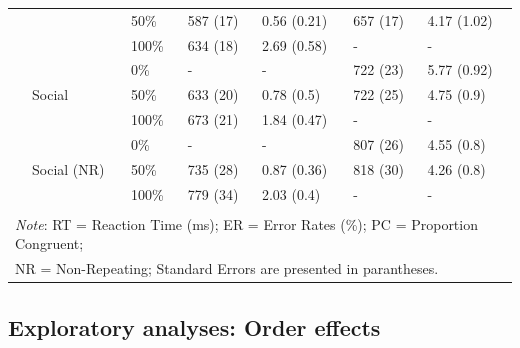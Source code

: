 \documentclass[english,,man,floatsintext]{apa6}
\begin{document}
\begin{table}[htbp]
\begin{tabular}{lllcccc}
& & \multicolumn{1}{l}{50\%} & \multicolumn{1}{l}{587 (17)} & \multicolumn{1}{l}{0.56 (0.21)} & \multicolumn{1}{l}{657 (17)} & \multicolumn{1}{l}{4.17 (1.02)} \\
& & \multicolumn{1}{l}{100\%} & \multicolumn{1}{l}{634 (18)} & \multicolumn{1}{l}{2.69 (0.58)} & \multicolumn{1}{l}{-} & \multicolumn{1}{l}{-} \\
\cmidrule(rl){2-7}
& \multirow{3}{*}{Social} & \multicolumn{1}{l}{0\%} & \multicolumn{1}{l}{-} & \multicolumn{1}{l}{-} & \multicolumn{1}{l}{722 (23)} & \multicolumn{1}{l}{5.77 (0.92)} \\
& & \multicolumn{1}{l}{50\%} & \multicolumn{1}{l}{633 (20)} & \multicolumn{1}{l}{0.78 (0.5)} & \multicolumn{1}{l}{722 (25)} & \multicolumn{1}{l}{4.75 (0.9)} \\
& & \multicolumn{1}{l}{100\%} & \multicolumn{1}{l}{673 (21)} & \multicolumn{1}{l}{1.84 (0.47)} & \multicolumn{1}{l}{-} & \multicolumn{1}{l}{-} \\
\cmidrule(rl){2-7}
& \multirow{3}{*}{Social (NR)} & \multicolumn{1}{l}{0\%} & \multicolumn{1}{l}{-} & \multicolumn{1}{l}{-} & \multicolumn{1}{l}{807 (26)} & \multicolumn{1}{l}{4.55 (0.8)} \\
& & \multicolumn{1}{l}{50\%} & \multicolumn{1}{l}{735 (28)} & \multicolumn{1}{l}{0.87 (0.36)} & \multicolumn{1}{l}{818 (30)} & \multicolumn{1}{l}{4.26 (0.8)} \\
& & \multicolumn{1}{l}{100\%} & \multicolumn{1}{l}{779 (34)} & \multicolumn{1}{l}{2.03 (0.4)} & \multicolumn{1}{l}{-} & \multicolumn{1}{l}{-} \\
 & & & & & & \\
\bottomrule
\multicolumn{7}{l}{\textit{Note}: RT = Reaction Time (ms);  ER = Error Rates (\%); PC = Proportion Congruent;} \\
\multicolumn{7}{l}{NR = Non-Repeating; Standard Errors are presented in parantheses.} \\
\end{tabular}%
\end{table}

\hypertarget{exploratory-analyses-order-effects}{%
\subsection{Exploratory analyses: Order effects}\label{exploratory-analyses-order-effects}}
\end{document}
